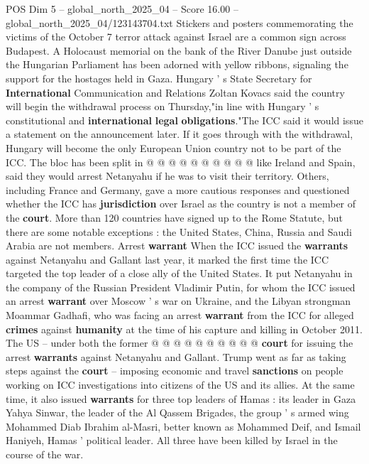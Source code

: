 \begin{textsample}{POS Dim 5 – global\_north\_2025\_04 – Score 16.00 – global\_north\_2025\_04/123143704.txt}
Stickers and posters commemorating the victims of the October 7 terror attack against Israel are a common sign across Budapest.
A Holocaust memorial on the bank of the River Danube just outside the Hungarian Parliament has been adorned with yellow ribbons, signaling the support for the hostages held in Gaza.
Hungary ' s State Secretary for \textbf{International} Communication and Relations Zoltan Kovacs said the country will begin the withdrawal process on Thursday,"in line with Hungary ' s constitutional and \textbf{international} \textbf{legal} \textbf{obligations}."The ICC said it would issue a statement on the announcement later.
If it goes through with the withdrawal, Hungary will become the only European Union country not to be part of the ICC.
The bloc has been split in @ @ @ @ @ @ @ @ @ @ like Ireland and Spain, said they would arrest Netanyahu if he was to visit their territory.
Others, including France and Germany, gave a more cautious responses and questioned whether the ICC has \textbf{jurisdiction} over Israel as the country is not a member of the \textbf{court}.
More than 120 countries have signed up to the Rome Statute, but there are some notable exceptions : the United States, China, Russia and Saudi Arabia are not members.
Arrest \textbf{warrant} When the ICC issued the \textbf{warrants} against Netanyahu and Gallant last year, it marked the first time the ICC targeted the top leader of a close ally of the United States.
It put Netanyahu in the company of the Russian President Vladimir Putin, for whom the ICC issued an arrest \textbf{warrant} over Moscow ' s war on Ukraine, and the Libyan strongman Moammar Gadhafi, who was facing an arrest \textbf{warrant} from the ICC for alleged \textbf{crimes} against \textbf{humanity} at the time of his capture and killing in October 2011.
The US -- under both the former @ @ @ @ @ @ @ @ @ @ \textbf{court} for issuing the arrest \textbf{warrants} against Netanyahu and Gallant.
Trump went as far as taking steps against the \textbf{court} -- imposing economic and travel \textbf{sanctions} on people working on ICC investigations into citizens of the US and its allies.
At the same time, it also issued \textbf{warrants} for three top leaders of Hamas : its leader in Gaza Yahya Sinwar, the leader of the Al Qassem Brigades, the group ' s armed wing Mohammed Diab Ibrahim al-Masri, better known as Mohammed Deif, and Ismail Haniyeh, Hamas ' political leader.
All three have been killed by Israel in the course of the war.

\end{textsample}
